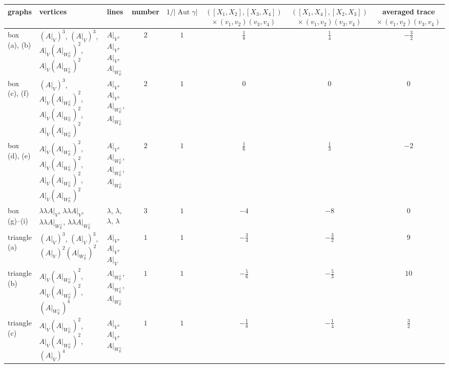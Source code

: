

\begin{tabular}{l|l|l|c|c|c|c|c}
graphs & vertices & lines & number & $1/|\operatorname{Aut}\gamma|$ & $([X_1,X_2],[X_3,X_4])$ $\times\,(v_1,v_2)(v_3,v_4)$ & $([X_1,X_4],[X_2,X_3])$ $\times\,(v_1,v_2)(v_3,v_4)$ & averaged trace $\times\,(v_1,v_2)(v_3,v_4)$ \\
\hline
box (a), (b) & $(A|_V)^3$, $(A|_V)^3$, $A|_V(A|_{W_{\mathbb R}^\perp})^2$, $A|_V(A|_{W_{\mathbb R}^\perp})^2$ & $A|_V$, $A|_V$, $A|_V$, $A|_{W_{\mathbb R}^\perp}$ & $2$ & $1$ & $\tfrac{1}{8}$ & $\tfrac{1}{4}$ & $-\tfrac{3}{2}$ \\
box (c), (f) & $(A|_V)^3$, $A|_V(A|_{W_{\mathbb R}^\perp})^2$, $A|_V(A|_{W_{\mathbb R}^\perp})^2$, $A|_V(A|_{W_{\mathbb R}^\perp})^2$ & $A|_V$, $A|_V$, $A|_{W_{\mathbb R}^\perp}$, $A|_{W_{\mathbb R}^\perp}$ & $2$ & $1$ & $0$ & $0$ & $0$ \\
box (d), (e) & $A|_V(A|_{W_{\mathbb R}^\perp})^2$, $A|_V(A|_{W_{\mathbb R}^\perp})^2$, $A|_V(A|_{W_{\mathbb R}^\perp})^2$, $A|_V(A|_{W_{\mathbb R}^\perp})^2$ & $A|_V$, $A|_{W_{\mathbb R}^\perp}$, $A|_{W_{\mathbb R}^\perp}$, $A|_{W_{\mathbb R}^\perp}$ & $2$ & $1$ & $\tfrac{1}{6}$ & $\tfrac{1}{3}$ & $-2$ \\
box (g)--(i) & $\lambda\lambda A|_V$, $\lambda\lambda A|_V$, $\lambda\lambda A|_{W_{\mathbb R}^\perp}$, $\lambda\lambda A|_{W_{\mathbb R}^\perp}$ & $\lambda$, $\lambda$, $\lambda$, $\lambda$ & $3$ & $1$ & $-4$ & $-8$ & $0$ \\
triangle (a) & $(A|_V)^3$, $(A|_V)^3$, $(A|_V)^2(A|_{W_{\mathbb R}^\perp})^2$ & $A|_V$, $A|_V$, $A|_V$ & $1$ & $1$ & $-\tfrac{3}{4}$ & $-\tfrac{3}{2}$ & $9$ \\
triangle (b) & $A|_V(A|_{W_{\mathbb R}^\perp})^2$, $A|_V(A|_{W_{\mathbb R}^\perp})^2$, $(A|_{W_{\mathbb R}^\perp})^4$ & $A|_{W_{\mathbb R}^\perp}$, $A|_{W_{\mathbb R}^\perp}$, $A|_{W_{\mathbb R}^\perp}$ & $1$ & $1$ & $-\tfrac{5}{6}$ & $-\tfrac{5}{3}$ & $10$ \\
triangle (c) & $A|_V(A|_{W_{\mathbb R}^\perp})^2$, $A|_V(A|_{W_{\mathbb R}^\perp})^2$, $(A|_V)^4$ & $A|_V$, $A|_V$, $A|_{W_{\mathbb R}^\perp}$ & $1$ & $1$ & $-\tfrac{1}{8}$ & $-\tfrac{1}{4}$ & $\tfrac{3}{2}$ \\

\end{tabular}
